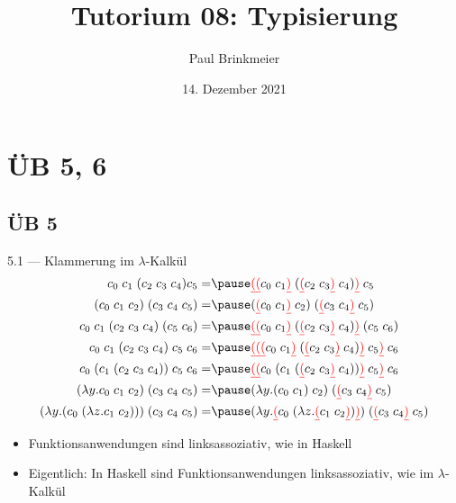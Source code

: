 \documentclass{beamer}
\title{Tutorium 08: Typisierung}
\author{Paul Brinkmeier}
\institute{Tutorium Programmierparadigmen am KIT}
\date{14. Dezember 2021}
\begin{document}
\begin{frame}
    \titlepage
\end{frame}

\section{ÜB 5, 6}

\subsection{ÜB 5}

\newcommand{\E}{\;}

\newcommand{\liin}[2]{#1\E{}#2}
\newcommand{\liiin}[3]{#1\E{}#2\E{}#3}
\newcommand{\livn}[4]{#1\E{}#2\E{}#3\E{}#4}
\newcommand{\lvn}[5]{#1\E{}#2\E{}#3\E{}#4\E{}#5}

\newcommand{\lii}[2]{(#1\E{}#2)}
\newcommand{\liii}[3]{(#1\E{}#2\E{}#3)}

\newcommand{\liir}[2]{\textcolor{red}{\underline{(}}#1\E{}#2\textcolor{red}{\underline{)}}}
\newcommand{\liiir}[3]{\textcolor{red}{\underline{(}}#1\E{}#2\E{}#3\textcolor{red}{\underline{)}}}

\newcommand{\abs}[2]{\lambda{}#1.#2}

\begin{frame}{5.1 --- Klammerung im $\lambda$-Kalkül}
	\footnotesize
	\begin{eqnarray}
		\liiin{c_0}{c_1}{\liii{c_2}{c_3}{c_4}}{c_5}                   =& \pause \liin{\liir{\liir{c_0}{c_1}}{\lii{\liir{c_2}{c_3}}{c_4}}}{c_5}             \\
		\liin{\liii{c_0}{c_1}{c_2}}{\liii{c_3}{c_4}{c_5}}             =& \pause \liin{\lii{\liir{c_0}{c_1}}{c_2}}{\lii{\liir{c_3}{c_4}}{c_5}}              \\
		\livn{c_0}{c_1}{\liii{c_2}{c_3}{c_4}}{\lii{c_5}{c_6}}         =& \pause \liin{\liir{\liir{c_0}{c_1}}{\lii{\liir{c_2}{c_3}}{c_4}}}{\lii{c_5}{c_6}}  \\
		\lvn{c_0}{c_1}{\liii{c_2}{c_3}{c_4}}{c_5}{c_6}                =& \pause \liin{\liir{\liir{\liir{c_0}{c_1}}{\lii{\liir{c_2}{c_3}}{c_4}}}{c_5}}{c_6} \\
		\livn{c_0}{\lii{c_1}{\liii{c_2}{c_3}{c_4}}}{c_5}{c_6}         =& \pause \liin{\liir{\liir{c_0}{\lii{c_1}{\lii{\liir{c_2}{c_3}}{c_4}}}}{c_5}}{c_6}  \\
		\liin{(\abs{y}{\liiin{c_0}{c_1}{c_2}})}{\liii{c_3}{c_4}{c_5}} =& \pause \liin{(\abs{y}{\liin{\lii{c_0}{c_1}}{c_2}})}{\lii{\liir{c_3}{c_4}}{c_5}}  \\
                \liin{(\abs{y}{\lii{c_0}{(\abs{z}{\liin{c_1}{c_2}})}})}{\liii{c_3}{c_4}{c_5}} =& \pause \liin{(\abs{y}{\liir{c_0}{(\abs{z}{\liir{c_1}{c_2}})}})}{\lii{\liir{c_3}{c_4}}{c_5}}
	\end{eqnarray}

	\normalsize
	\begin{itemize}
		\item Funktionsanwendungen sind linksassoziativ, wie in Haskell
		\item Eigentlich: In Haskell sind Funktionsanwendungen linksassoziativ, wie im $\lambda$-Kalkül
	\end{itemize}
\end{frame}
\end{document}
